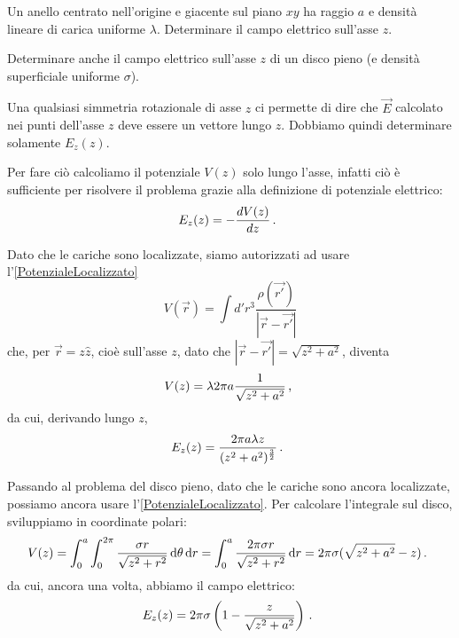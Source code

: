 \documentclass[../main.tex]{subfiles}
\begin{document}
\label{ex:CampoAsseAnello}
\textex
Un anello centrato nell'origine e giacente sul piano $xy$ ha raggio $a$ e densità lineare di carica uniforme $\lambda$. Determinare il campo elettrico sull'asse $z$.

Determinare anche il campo elettrico sull'asse $z$ di un disco pieno (e densità superficiale uniforme $\sigma$).

\solution

Una qualsiasi simmetria rotazionale di asse $z$ ci permette di dire che $\vec{E}$ calcolato nei punti dell'asse $z$ deve essere un vettore lungo $z$.
Dobbiamo quindi determinare solamente $E_z(z)$.

Per fare ciò calcoliamo il potenziale $V(z)$ solo lungo l'asse, infatti ciò è sufficiente per risolvere il problema grazie alla definizione di potenziale elettrico:
\[
	E_z(z)=-\frac{dV(z)}{dz}\, \text{. }
\]

Dato che le cariche sono localizzate, siamo autorizzati ad usare l'\cref{PotenzialeLocalizzato}
\[
	V(\vec{r})=\int d'r^3 \frac{\rho(\vec{r'})}{|\vec{r}-\vec{r'}|}
\]
che, per $\vec{r}=z\hat{z}$, cioè sull'asse $z$, dato che $|\vec{r}-\vec{r'}|=\sqrt{z^2+a^2}$, diventa
\[
	V(z)=\lambda 2\pi a \frac{1}{\sqrt{z^2+a^2}}\, \text{, }
\]
da cui, derivando lungo $z$,
\[
	E_z(z)=\frac{2\pi a\lambda z}{(z^2+a^2)^{\frac{3}{2}}}\, \text{. }
\]

Passando al problema del disco pieno, dato che le cariche sono ancora localizzate, possiamo ancora usare l'\cref{PotenzialeLocalizzato}. Per calcolare l'integrale sul disco, sviluppiamo in coordinate polari:
\[
	V(z)=\int_0^a \int_0^{2\pi} \frac{\sigma r}{\sqrt{z^2+r^2}}\,\mathrm d \theta \,\mathrm d r = \int_0^a \frac{2\pi\sigma r}{\sqrt{z^2+r^2}}\,\mathrm d r = 2\pi\sigma (\sqrt{z^2+a^2}-z)\, \text{. }
\]
da cui, ancora una volta, abbiamo il campo elettrico:
\[
	E_z(z)=2\pi\sigma \left(1-\frac{z}{\sqrt{z^2+a^2}}\right)\, \text{. }
\]
\end{document}
